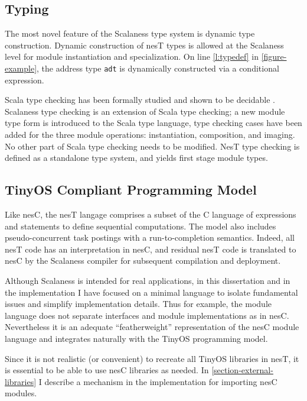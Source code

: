 \subsection{Typing} 

The most novel feature of the Scalaness type system is dynamic type construction. Dynamic
construction of nesT types is allowed at the Scalaness level for module instantiation and
specialization. On line \ref{l:typedef} in \autoref{figure-example}, the address type
\texttt{adt} is dynamically constructed via a conditional expression.

Scala type checking has been formally studied and shown to be decidable
\cite{Cremet:2006:CCS:2135978.2135980}. Scalaness type checking is an extension of Scala type
checking; a new module type form is introduced to the Scala type language, type checking cases
have been added for the three module operations: instantiation, composition, and imaging. No
other part of Scala type checking needs to be modified. NesT type checking is defined as a
standalone type system, and yields first stage module types.

\subsection{TinyOS Compliant Programming Model}

Like nesC, the nesT langage comprises a subset of the C language of expressions and statements
to define sequential computations. The model also includes pseudo-concurrent task postings with
a run-to-completion semantics. Indeed, all nesT code has an interpretation in nesC, and residual
nesT code is translated to nesC by the Scalaness compiler for subsequent compilation and
deployment.

Although Scalaness is intended for real applications, in this dissertation and in the
implementation I have focused on a minimal language to isolate fundamental issues and simplify
implementation details. Thus for example, the module language does not separate interfaces and
module implementations as in nesC. Nevertheless it is an adequate ``featherweight''
representation of the nesC module language and integrates naturally with the TinyOS programming
model.

Since it is not realistic (or convenient) to recreate all TinyOS libraries in nesT, it is
essential to be able to use nesC libraries as needed. In \autoref{section-external-libraries} I
describe a mechanism in the implementation for importing nesC modules.

